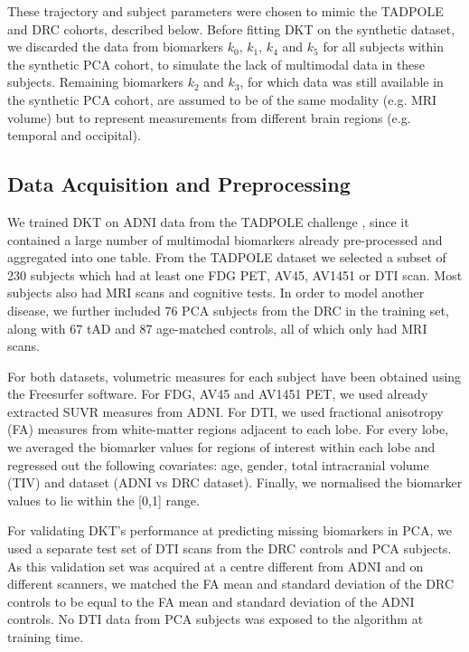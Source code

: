 These trajectory and subject parameters were chosen to mimic the TADPOLE and DRC cohorts, described below. Before fitting DKT on the synthetic dataset, we discarded the data from biomarkers $k_0$, $k_1$, $k_4$ and $k_5$ for all subjects within the synthetic PCA cohort, to simulate the lack of multimodal data in these subjects. Remaining biomarkers $k_2$ and $k_3$, for which data was still available in the synthetic PCA cohort, are assumed to be of the same modality (e.g. MRI volume) but to represent measurements from different brain regions (e.g. temporal and occipital). 


\subsection{Data Acquisition and Preprocessing}

We trained DKT on ADNI data from the TADPOLE challenge \cite{marinescu2018tadpole}, since it contained a large number of multimodal biomarkers already pre-processed and aggregated into one table. From the TADPOLE dataset we selected a subset of 230 subjects which had at least one FDG PET, AV45, AV1451 or DTI scan. Most subjects also had MRI scans and cognitive tests. In order to model another disease, we further included 76 PCA subjects from the DRC in the training set, along with 67 tAD and 87 age-matched controls, all of which only had MRI scans. 

For both datasets, volumetric measures for each subject have been obtained using the Freesurfer software. For FDG, AV45 and AV1451 PET, we used already extracted SUVR measures from ADNI. For DTI, we used fractional anisotropy (FA) measures from white-matter regions adjacent to each lobe. For every lobe, we averaged the biomarker values for regions of interest within each lobe and regressed out the following covariates: age, gender, total intracranial volume (TIV) and dataset (ADNI vs DRC dataset). Finally, we normalised the biomarker values to lie within the [0,1] range. 

For validating DKT's performance at predicting missing biomarkers in PCA, we used a separate test set of DTI scans from the DRC controls and PCA subjects. As this validation set was acquired at a centre different from ADNI and on different scanners, we matched the FA mean and standard deviation of the DRC controls to be equal to the FA mean and standard deviation of the ADNI controls. No DTI data from PCA subjects was exposed to the algorithm at training time.



